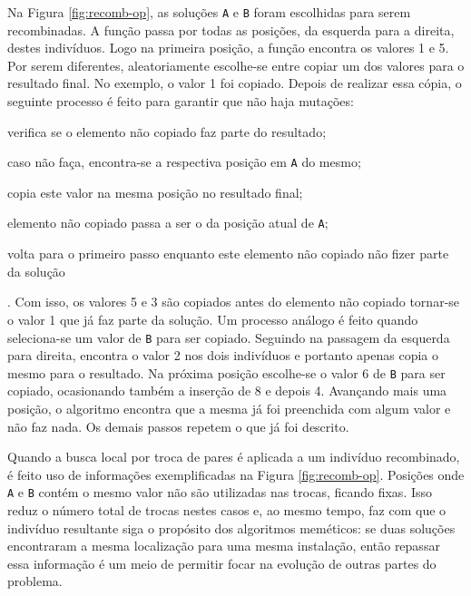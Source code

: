 Na Figura \ref{fig:recomb-op}, as soluções \verb!A! e \verb!B! foram
escolhidas para serem recombinadas. A função  passa
por todas as posições, da esquerda para a direita, destes
indivíduos. Logo na primeira posição, a função encontra os valores 1 e
5. Por serem diferentes, aleatoriamente escolhe-se entre copiar um dos
valores para o resultado final. No exemplo, o valor 1 foi
copiado. Depois de realizar essa cópia, o seguinte processo é feito
para garantir que não haja mutações: \begin{inparaenum}[(1)] \item
  verifica se o elemento não copiado faz parte do resultado; \item
  caso não faça, encontra-se a respectiva posição em \verb!A! do
  mesmo; \item copia este valor na mesma posição no resultado
  final; \item elemento não copiado passa a ser o da posição atual de
  \verb!A!; \item volta para o primeiro passo enquanto este elemento
  não copiado não fizer parte da solução\end{inparaenum}.
Com isso, os valores 5 e 3 são copiados antes do elemento não copiado
tornar-se o valor 1 que já faz parte da solução. Um processo análogo é
feito quando seleciona-se um valor de \verb!B! para ser
copiado. Seguindo na passagem da esquerda para direita,
 encontra o valor 2 nos dois indivíduos e portanto
apenas copia o mesmo para o resultado. Na próxima posição escolhe-se o
valor 6 de \verb!B! para ser copiado, ocasionando também a inserção de
8 e depois 4. Avançando mais uma posição, o algoritmo encontra que a
mesma já foi preenchida com algum valor e não faz nada. Os demais
passos repetem o que já foi descrito.

Quando a busca local por troca de pares é aplicada a um indivíduo
recombinado, é feito uso de informações exemplificadas na Figura
\ref{fig:recomb-op}. Posições onde \verb!A! e \verb!B! contém o
mesmo valor não são utilizadas nas trocas, ficando fixas. Isso reduz o
número total de trocas nestes casos e, ao mesmo tempo, faz com que o
indivíduo resultante siga o propósito dos algoritmos meméticos:
se duas soluções encontraram a mesma localização para uma mesma
instalação, então repassar essa informação é um meio de permitir focar
na evolução de outras partes do problema.

